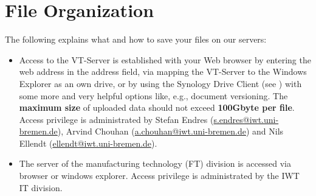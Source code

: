 \section{File Organization}
The following explains what and how to save your files on our servers:
\begin{itemize}
  \item Access to the VT-Server is established with your Web browser by entering the web address
        in the address field, via mapping the VT-Server to the Windows Explorer
        as an own drive, or by using the Synology Drive Client
        (see \cite{synology2022}) with some more and very helpful options like,
        e.g., document versioning. The \textbf{maximum size} of uploaded data
        should not exceed \textbf{100Gbyte per file}. Access privilege is
        administrated by
        Stefan Endres (\href{mailto:s.endres@iwt.uni-bremen.de}%
                       {s.endres@iwt.uni-bremen.de}),
        Arvind Chouhan (\href{mailto:a.chouhan@iwt.uni-bremen.de}%
                        {a.chouhan@iwt.uni-bremen.de})
        and Nils Ellendt (\href{mailto:ellendt@iwt.uni-bremen.de}%
                          {ellendt@iwt.uni-bremen.de}).
  \item The server of the manufacturing technology (FT) division is accessed via
        browser or windows explorer. Access privilege is administrated by the IWT IT
        division.
\end{itemize}

